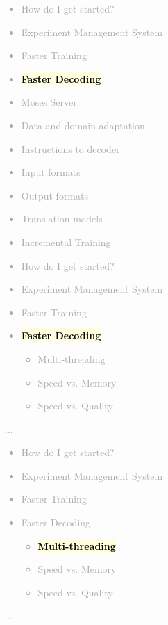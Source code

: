 \documentclass[landscape]{uedslides2C}
\newcommand{\currenttopic}[1]{\colorbox{lightyellow}{\textcolor{black}{\bf #1}}}
\begin{document}

\vspace{-5mm}
\textcolor{darkgrey}{
\small
\begin{itemize} \itemsep -1mm
\item {How do I get started?}
\item {Experiment Management System}
\item {Faster Training}
\item \currenttopic{Faster Decoding}
\item {Moses Server}
\item {Data and domain adaptation}
\item {Instructions to decoder}
\item {Input formats}
\item {Output formats}
\item {Translation models}
\item {Incremental Training}
\end{itemize}
}


\vspace{-5mm}
\textcolor{darkgrey}{
\begin{itemize} \itemsep -1mm
\item {How do I get started?}
\item {Experiment Management System}
\item {Faster Training}
\item \currenttopic{Faster Decoding}
  \begin{itemize}
  \item Multi-threading
  \item Speed vs. Memory
  \item Speed vs. Quality
  \end{itemize}
\end{itemize}
...
}


\vspace{-5mm}
\textcolor{darkgrey}{
\begin{itemize} \itemsep -1mm
\item {How do I get started?}
\item {Experiment Management System}
\item {Faster Training}
\item {Faster Decoding}
  \begin{itemize}
  \item \currenttopic{Multi-threading}
  \item Speed vs. Memory
  \item Speed vs. Quality
  \end{itemize}
\end{itemize}
...
}
\end{document}
